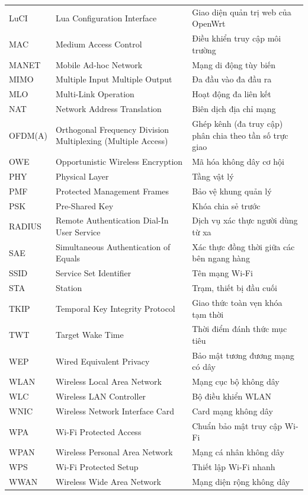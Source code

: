 \documentclass[12pt,a4paper]{article}
\numberwithin{figure}{section}
\numberwithin{table}{section}
\begin{document}
\begin{longtable}{@{}P{2.2cm} P{6.3cm} P{6.2cm}@{}}
  LuCI & Lua Configuration Interface & Giao diện quản trị web của OpenWrt\\
  MAC & Medium Access Control & Điều khiển truy cập môi trường\\
  MANET & Mobile Ad-hoc Network & Mạng di động tùy biến\\
  MIMO & Multiple Input Multiple Output & Đa đầu vào đa đầu ra\\
  MLO & Multi-Link Operation & Hoạt động đa liên kết\\
  NAT & Network Address Translation & Biên dịch địa chỉ mạng\\
  OFDM(A) & Orthogonal Frequency Division Multiplexing (Multiple Access) &
  Ghép kênh (đa truy cập) phân chia theo tần số trực giao\\
  OWE & Opportunistic Wireless Encryption & Mã hóa không dây cơ hội\\
  PHY & Physical Layer & Tầng vật lý\\
  PMF & Protected Management Frames & Bảo vệ khung quản lý\\
  PSK & Pre-Shared Key & Khóa chia sẻ trước\\
  RADIUS & Remote Authentication Dial-In User Service & Dịch vụ xác thực người
  dùng từ xa\\
  SAE & Simultaneous Authentication of Equals & Xác thực đồng thời giữa các bên
  ngang hàng\\
  SSID & Service Set Identifier & Tên mạng Wi-Fi\\
  STA & Station & Trạm, thiết bị đầu cuối\\
  TKIP & Temporal Key Integrity Protocol & Giao thức toàn vẹn khóa tạm thời\\
  TWT & Target Wake Time & Thời điểm đánh thức mục tiêu\\
  WEP & Wired Equivalent Privacy & Bảo mật tương đương mạng có dây\\
  WLAN & Wireless Local Area Network & Mạng cục bộ không dây\\
  WLC & Wireless LAN Controller & Bộ điều khiển WLAN\\
  WNIC & Wireless Network Interface Card & Card mạng không dây\\
  WPA & Wi-Fi Protected Access & Chuẩn bảo mật truy cập Wi-Fi\\
  WPAN & Wireless Personal Area Network & Mạng cá nhân không dây\\
  WPS & Wi-Fi Protected Setup & Thiết lập Wi-Fi nhanh\\
  WWAN & Wireless Wide Area Network & Mạng diện rộng không dây\\
\end{longtable}
\end{document}
